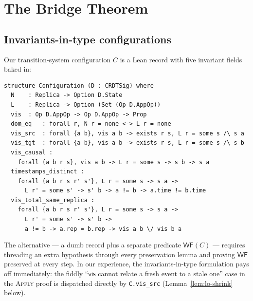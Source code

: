 \documentclass[11pt,a4paper]{article}
\theoremstyle{definition}
\theoremstyle{remark}
\newcommand{\mvis}{\mathsf{vis}}
\newcommand{\wellformed}{\mathsf{WF}}
\begin{document}
\section{The Bridge Theorem}
\label{sec:bridge}

\subsection{Invariants-in-type configurations}
\label{sec:invariants}

Our transition-system configuration $C$ is a Lean record with five
invariant fields baked in:
\begin{lstlisting}[caption={\texttt{Configuration} with invariants,
                           \texttt{Sal/Emulation/CRDT\_TS.lean}.},
                   label=lst:config]
structure Configuration (D : CRDTSig) where
  N    : Replica -> Option D.State
  L    : Replica -> Option (Set (Op D.AppOp))
  vis  : Op D.AppOp -> Op D.AppOp -> Prop
  dom_eq   : forall r, N r = none <-> L r = none
  vis_src  : forall {a b}, vis a b -> exists r s, L r = some s /\ s a
  vis_tgt  : forall {a b}, vis a b -> exists r s, L r = some s /\ s b
  vis_causal :
    forall {a b r s}, vis a b -> L r = some s -> s b -> s a
  timestamps_distinct :
    forall {a b r s r' s'}, L r = some s -> s a ->
      L r' = some s' -> s' b -> a != b -> a.time != b.time
  vis_total_same_replica :
    forall {a b r s r' s'}, L r = some s -> s a ->
      L r' = some s' -> s' b ->
      a != b -> a.rep = b.rep -> vis a b \/ vis b a
\end{lstlisting}

The alternative --- a dumb record plus a separate predicate
$\wellformed(C)$ --- requires threading an extra hypothesis through
every preservation lemma and proving $\wellformed$ preserved at
every step. In our experience, the invariants-in-type formulation
pays off immediately: the fiddly ``$\mvis$ cannot relate a fresh event
to a stale one'' case in the \textsc{Apply} proof is dispatched
directly by \texttt{C.vis\_src} (Lemma~\ref{lem:lo-shrink} below).
\end{document}
